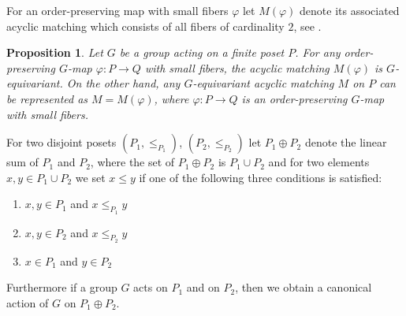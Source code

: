 \documentclass{elsarticle}
\newtheorem{prop}[df]{Proposition}
\begin{document}
For an order-preserving map with small fibers $\varphi$ let $M(\varphi)$ denote its associated acyclic matching which consists of all fibers of cardinality $2$, see \cite[Chapter 11]{buch}.
\begin{prop}
Let $G$ be a group acting on a finite poset $P$. For any order-preserving $G$-map $\varphi:P\longrightarrow Q$ with small fibers, the acyclic matching $M(\varphi)$ is $G$-equivariant. On the other hand, any $G$-equivariant acyclic matching $M$ on $P$ can be represented as $M=M(\varphi)$, where $\varphi:P\longrightarrow Q$ is an order-preserving $G$-map with small fibers.
\end{prop}
For two disjoint posets $(P_1,\leq_{P_1})$, $(P_2,\leq_{P_2})$ let $P_1\oplus P_2$ denote the linear sum of $P_1$ and $P_2$, where the set of $P_1\oplus P_2$ is $P_1\cup P_2$ and for two elements $x,y\in P_1\cup P_2$ we set $x\leq y$ if one of the following three conditions is satisfied:
\begin{enumerate}
\item $x,y\in P_1$ and $x\leq_{P_1} y$
\item $x,y\in P_2$ and $x\leq_{P_2} y$
\item $x\in P_1$ and $y\in P_2$
\end{enumerate}
Furthermore if a group $G$ acts on $P_1$ and on $P_2$, then we obtain a canonical action of $G$ on $P_1\oplus P_2$.
\end{document}
